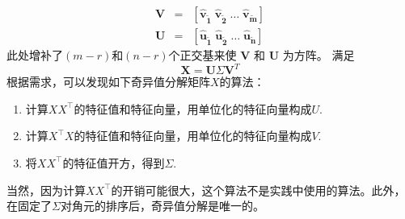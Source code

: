 \documentclass[lang=cn,newtx,10pt,scheme=chinese,chinesefont=nofont,citestyle=gb7714-2015, bibstyle=gb7714-2015]{elegantbook}
\begin{document}
\begin{refsection}
\begin{eqnarray*}
\mathbf{V} & = & \left[\mathbf{\hat{v}_{\tilde{1}}}\;\mathbf{\hat{v}_{\tilde{2}}}\;\ldots\;\mathbf{\hat{v}_{\tilde{m}}} \right] \\
\mathbf{U} & = & \left[\mathbf{\hat{u}_{\tilde{1}}}\;\mathbf{\hat{u}_{\tilde{2}}}\;\ldots\;\mathbf{\hat{u}_{\tilde{n}}} \right] 
\end{eqnarray*}
此处增补了$(m-r)$和$(n-r)$个正交基来使
$\mathbf{V}$ 和 $\mathbf{U}$ 为方阵。 满足%
\begin{equation}
\mathbf{X = U} \Sigma \mathbf{V}^T
\label{eqn:svd-matrix}
\end{equation}
根据需求，可以发现如下奇异值分解矩阵$X$的算法：
\begin{enumerate}
    \item 计算$XX^\top$的特征值和特征向量，用单位化的特征向量构成$U$.
    \item 计算$X^\top X$的特征值和特征向量，用单位化的特征向量构成$V$.
    \item 将$XX^\top$的特征值开方，得到$\Sigma$.
\end{enumerate}
当然，因为计算$XX^\top$的开销可能很大，这个算法不是实践中使用的算法。此外，在固定了$\Sigma$对角元的排序后，奇异值分解是唯一的。

\end{refsection}
\end{document}
